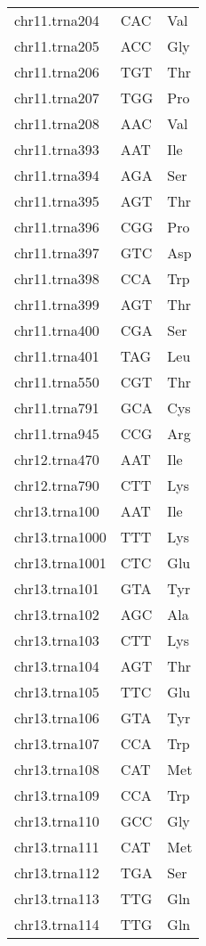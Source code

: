 \begin{longtable}{@{}l>{\collectcell\anticodon}l<{\endcollectcell}l@{}}
    chr11.trna204 & CAC & Val \\
    chr11.trna205 & ACC & Gly \\
    chr11.trna206 & TGT & Thr \\
    chr11.trna207 & TGG & Pro \\
    chr11.trna208 & AAC & Val \\
    chr11.trna393 & AAT & Ile \\
    chr11.trna394 & AGA & Ser \\
    chr11.trna395 & AGT & Thr \\
    chr11.trna396 & CGG & Pro \\
    chr11.trna397 & GTC & Asp \\
    chr11.trna398 & CCA & Trp \\
    chr11.trna399 & AGT & Thr \\
    chr11.trna400 & CGA & Ser \\
    chr11.trna401 & TAG & Leu \\
    chr11.trna550 & CGT & Thr \\
    chr11.trna791 & GCA & Cys \\
    chr11.trna945 & CCG & Arg \\
    chr12.trna470 & AAT & Ile \\
    chr12.trna790 & CTT & Lys \\
    chr13.trna100 & AAT & Ile \\
    chr13.trna1000 & TTT & Lys \\
    chr13.trna1001 & CTC & Glu \\
    chr13.trna101 & GTA & Tyr \\
    chr13.trna102 & AGC & Ala \\
    chr13.trna103 & CTT & Lys \\
    chr13.trna104 & AGT & Thr \\
    chr13.trna105 & TTC & Glu \\
    chr13.trna106 & GTA & Tyr \\
    chr13.trna107 & CCA & Trp \\
    chr13.trna108 & CAT & Met \\
    chr13.trna109 & CCA & Trp \\
    chr13.trna110 & GCC & Gly \\
    chr13.trna111 & CAT & Met \\
    chr13.trna112 & TGA & Ser \\
    chr13.trna113 & TTG & Gln \\
    chr13.trna114 & TTG & Gln \\

\end{longtable}
